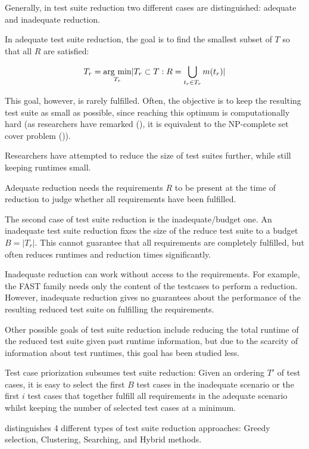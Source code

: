 Generally, in test suite reduction two different cases are distinguished:
adequate and inadequate reduction.

In adequate test suite reduction, the goal is to find the smallest subset
of $T$ so that all $R$ are satisfied:

$$T_{r}=\underset{T_r}{\hbox{arg min}} |T_{r} \subset T: R=\bigcup_{t_{r} \in T_{r}} m(t_{r})|$$

This goal, however, is rarely fulfilled. Often, the objective is to
keep the resulting test suite as small as possible, since reaching
this optimum is computationally hard (as researchers have remarked
(\cite{khan2016survey}), it is equivalent to the NP-complete set cover
problem (\cite{garey1979computers})).

Researchers have attempted to reduce the size of test suites further,
while still keeping runtimes small.

Adequate reduction needs the requirements $R$ to be present at the time
of reduction to judge whether all requirements have been fulfilled.

The second case of test suite reduction is the inadequate/budget one. An
inadequate test suite reduction fixes the size of the reduce test suite
to a budget $B=|T_{r}|$. This cannot guarantee that all requirements
are completely fulfilled, but often reduces runtimes and reduction
times significantly.

Inadequate reduction can work without access to the requirements.
For example, the FAST family needs only the content of the testcases to
perform a reduction. However, inadequate reduction gives no guarantees
about the performance of the resulting reduced test suite on fulfilling
the requirements.

Other possible goals of test suite reduction include reducing the total
runtime of the reduced test suite given past runtime information, but
due to the scarcity of information about test runtimes, this goal has
been studied less.

Test case priorization subsumes test suite reduction: Given an ordering
$T'$ of test cases, it is easy to select the first $B$ test cases in the
inadequate scenario or the first $i$ test cases that together fulfill
all requirements in the adequate scenario whilst keeping the number of
selected test cases at a minimum.

\cite{khan2018systematic} distinguishes 4 different types of test
suite reduction approaches: Greedy selection, Clustering, Searching,
and Hybrid methods.


